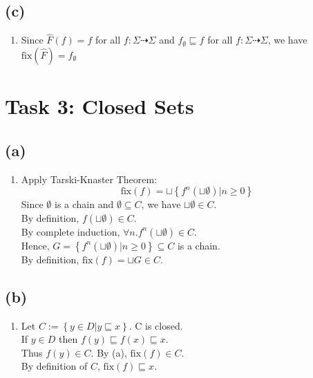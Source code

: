 \documentclass[12pt]{scrartcl}
\begin{document}
	\subsection*{(c)}
	
	\begin{enumerate}
	\item[] Since $\hat{F}\left(f\right)=f$ for all $f:\Sigma \dashrightarrow \Sigma$ and $f_{\emptyset}\sqsubseteq f$ for all $f:\Sigma\dashrightarrow \Sigma$, we have $\text{fix}\left(\hat{F}\right)=f_{\emptyset}$
	
	\end{enumerate}
	
	\section*{Task 3: Closed Sets}
	
	\subsection*{(a)}
	
	\begin{enumerate}
	\item[] Apply Tarski-Knaster Theorem:
	\[\text{fix}\left(f\right)=\sqcup\left\{f^{n}\left(\sqcup\emptyset\right)|n\geq 0\right\}\]
	Since $\emptyset$ is a chain and $\emptyset\subseteq C$, we have $\sqcup\emptyset\in C$.\\
	By definition, $f\left(\sqcup\emptyset\right)\in C$.\\
	By complete induction, $\forall n.f^{n}\left(\sqcup\emptyset\right)\in C$.\\
	Hence, $G=\left\{f^{n}\left(\sqcup\emptyset\right)|n\geq 0\right\}\subseteq C$ is a chain.\\
	By definition, $\text{fix}\left(f\right)=\sqcup G\in C$.
	\end{enumerate}
	
	\subsection*{(b)}
	
	\begin{enumerate}
	\item[] Let $C:=\left\{y\in D|y\sqsubseteq x\right\}$. C is closed.\\
	If $y\in D$ then $f\left(y\right)\sqsubseteq f\left(x\right)\sqsubseteq x$.\\
	Thus $f\left(y\right)\in C$. By (a), $\text{fix}\left(f\right)\in C$.\\
	By definition of $C$, $\text{fix}\left(f\right)\sqsubseteq x$.
	\end{enumerate}
	
\end{document}
